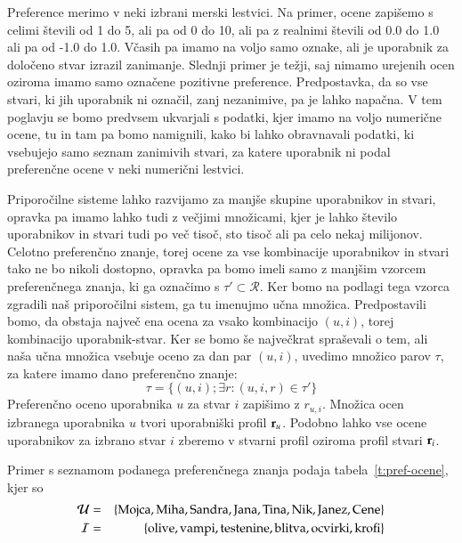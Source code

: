 Preference merimo v neki izbrani merski lestvici. Na primer, ocene zapišemo s celimi števili od 1 do 5, ali pa od 0 do 10, ali pa z realnimi števili od 0.0 do 1.0 ali pa od -1.0 do 1.0. Včasih pa imamo na voljo samo oznake, ali je uporabnik za določeno stvar izrazil zanimanje. Slednji primer je težji, saj nimamo urejenih ocen oziroma imamo samo označene pozitivne preference. Predpostavka, da so vse stvari, ki jih uporabnik ni označil, zanj nezanimive, pa je lahko napačna. V tem poglavju se bomo predvsem ukvarjali s podatki, kjer imamo na voljo numerične ocene, tu in tam pa bomo namignili, kako bi lahko obravnavali podatki, ki vsebujejo samo seznam zanimivih stvari, za katere uporabnik ni podal preferenčne ocene v neki numerični lestvici.

Priporočilne sisteme lahko razvijamo za manjše skupine uporabnikov in stvari, opravka pa imamo lahko tudi z večjimi množicami, kjer je lahko število uporabnikov in stvari tudi po več tisoč, sto tisoč ali pa celo nekaj milijonov. Celotno preferenčno znanje, torej ocene za vse kombinacije uporabnikov in stvari tako ne bo nikoli dostopno, opravka pa bomo imeli samo z manjšim vzorcem preferenčnega znanja, ki ga označimo s $\tau'\subset\mathcal{R}$. Ker bomo na podlagi tega vzorca zgradili naš priporočilni sistem, ga tu imenujmo učna množica. Predpostavili bomo, da obstaja največ ena ocena za vsako kombinacijo $(u, i)$, torej kombinacijo uporabnik-stvar. Ker se bomo še največkrat spraševali o tem, ali naša učna množica vsebuje oceno za dan par $(u,i)$, uvedimo množico parov $\tau$, za katere imamo dano preferenčno znanje:
%
$$\tau=\{(u,i); \exists r:(u,i,r)\in\tau'\}$$
%
Preferenčno oceno uporabnika $u$ za stvar $i$ zapišimo z $r_{u,i}$. Množica ocen izbranega uporabnika $u$ tvori uporabniški profil ${\bf r}_u$. Podobno lahko vse ocene uporabnikov za izbrano stvar $i$ zberemo v stvarni profil oziroma profil stvari ${\bf r}_i$.

Primer s seznamom podanega preferenčnega znanja podaja tabela~\ref{t:pref-ocene}, kjer so
\begin{eqnarray}
{\mathcal U} & = & \{ {\rm Mojca}, {\rm Miha}, {\rm Sandra}, {\rm Jana}, {\rm Tina}, {\rm Nik}, {\rm Janez}, {\rm Cene} \} \nonumber \\
{\mathcal I} & = & \{ {\rm olive}, {\rm vampi}, {\rm testenine}, {\rm blitva}, {\rm ocvirki}, {\rm krofi} \} \nonumber
\end{eqnarray}

